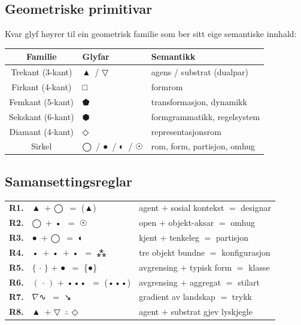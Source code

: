 \documentclass[a4paper,11pt]{article}
\newcommand{\g}[1]{{\symbolfont #1}}
\newcommand{\gAgent}{\g{▲}}
\newcommand{\gDesignar}{\g{(▲)}}
\newcommand{\gForm}{\g{●}}
\newcommand{\gGrammatikk}{\g{⬢}}
\newcommand{\gFormrom}{\g{□}}
\newcommand{\gKlasse}{\g{\{●\}}}
\newcommand{\gLyskjegle}{\g{◇}}
\newcommand{\gKonfig}{\g{⁂}}
\newcommand{\gObjekt}{\g{•}}
\newcommand{\gOmhug}{\g{☉}}
\newcommand{\gPartisjon}{\g{◐}}
\newcommand{\gTrykk}{\g{↘}}
\newcommand{\gStilart}{\g{(•••)}}
\newcommand{\gSubstrat}{\g{▽}}
\newcommand{\gLandskap}{\g{∿}}
\newcommand{\gTransform}{\g{⬟}}
\newcommand{\gSirkel}{\g{◯}}
\begin{document}
\subsection{Geometriske primitivar}

Kvar glyf høyrer til ein geometrisk familie som ber sitt eige semantiske innhald:

\begin{center}
\begin{tabular}{@{}cll@{}}
\textbf{Familie} & \textbf{Glyfar} & \textbf{Semantikk}\\
\hline
Trekant (3-kant)  & \gAgent\ / \gSubstrat                & agens / substrat (dualpar)\\
Firkant (4-kant)  & \gFormrom                             & formrom\\
Femkant (5-kant)  & \gTransform                           & transformasjon, dynamikk\\
Sekskant (6-kant) & \gGrammatikk                          & formgrammatikk, regelsystem\\
Diamant (4-kant)  & \gLyskjegle                           & representasjonsrom\\
Sirkel            & \gSirkel\ / \gForm\ / \gPartisjon\ / \gOmhug & rom, form, partisjon, omhug\\
\end{tabular}
\end{center}

\subsection{Samansettingsreglar}

\begin{center}
\begin{tabular}{@{}rl@{\hspace{1em}}l@{}}
\textbf{R1.} & \gAgent\ $+$ \gSirkel\ $=$ \gDesignar         & agent $+$ sosial kontekst $=$ designar\\
\textbf{R2.} & \gSirkel\ $+$ \gObjekt\ $=$ \gOmhug           & open $+$ objekt-aksar $=$ omhug\\
\textbf{R3.} & \gForm\ $+$ \gSirkel\ $=$ \gPartisjon         & kjent $+$ tenkeleg $=$ partisjon\\
\textbf{R4.} & \gObjekt\ $+$ \gObjekt\ $+$ \gObjekt\ $=$ \gKonfig & tre objekt bundne $=$ konfigurasjon\\
\textbf{R5.} & $\{\,\cdot\,\}$ $+$ \gForm\ $=$ \gKlasse       & avgrensing $+$ typisk form $=$ klasse\\
\textbf{R6.} & $(\,\cdot\,)$ $+$ \gObjekt\gObjekt\gObjekt\ $=$ \gStilart & avgrensing $+$ aggregat $=$ stilart\\
\textbf{R7.} & $\nabla$\gLandskap\ $=$ \gTrykk              & gradient av landskap $=$ trykk\\
\textbf{R8.} & \gAgent\ $+$ \gSubstrat\ $\therefore$ \gLyskjegle & agent $+$ substrat gjev lyskjegle\\
\end{tabular}
\end{center}
\end{document}
